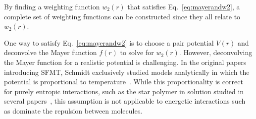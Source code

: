 \documentclass[letterpaper,twocolumn,amsmath,amssymb,prb]{revtex4-1}
\begin{document}
By finding a weighting function $w_2(r)$ that satisfies 
Eq.~\ref{eq:mayerandw2}, a complete set of weighting functions
can be constructed since they all relate to $w_2(r)$.

One way to satisfy Eq.~\ref{eq:mayerandw2} is to choose a pair 
potential $V(r)$ and deconvolve the Mayer function $f(r)$ to solve for $w_2(r)$. 
However, deconvolving the Mayer function for a realistic potential is 
challenging. %
In the original papers introducing SFMT, Schmidt
exclusively studied models analytically in which the potential is
proportional to temperature~\cite{schmidt1999density,
  schmidt2000fluid}.  While this proportionality is correct for purely
entropic interactions, such as the star polymer in solution studied in
several papers~\cite{schmidt1999density}, this assumption is not
applicable to energetic interactions such as dominate the repulsion
between molecules.
\end{document}
